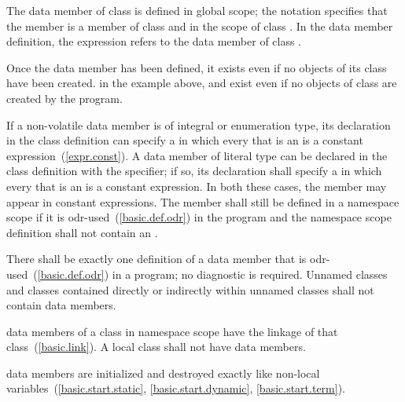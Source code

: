 The  data member  of class
 is defined in global scope; the notation
 specifies that the member 
is a member of class  and in the scope of class
. In the  data member definition, the
 expression refers to the  data
member  of class .
\exitexample

\enternote
Once the  data member has been defined, it exists even if
no objects of its class have been created.
\enterexample
in the example above,  and  exist even
if no objects of class  are created by the program.
\exitexample
\exitnote

\pnum
If a non-volatile   data member is
of integral or enumeration type,
its declaration in the class definition can specify a
 in which every
 that is an 
is a constant expression~(\ref{expr.const}). A  data member of
literal type can be declared in the class definition with the
 specifier; if so, its declaration shall specify a
 in which every
 that is an 
is a constant expression. \enternote In both these cases,
the member may appear in constant expressions. \exitnote The
member shall still be defined in a namespace scope if
it is odr-used~(\ref{basic.def.odr}) in the program and the
namespace scope definition shall not contain an .

\pnum
\enternote
There shall be exactly one definition of a  data member
that is odr-used~(\ref{basic.def.odr}) in a program; no diagnostic is required.
\exitnote
Unnamed classes and classes contained directly
or indirectly within unnamed classes shall not contain 
data members.

\pnum
{}%
 data members of a class in namespace scope have
the linkage of that class~(\ref{basic.link}). A local class shall not have 
data members.

\pnum
{} data members are initialized and destroyed exactly like
non-local variables~(\ref{basic.start.static}, \ref{basic.start.dynamic},
\ref{basic.start.term}).

